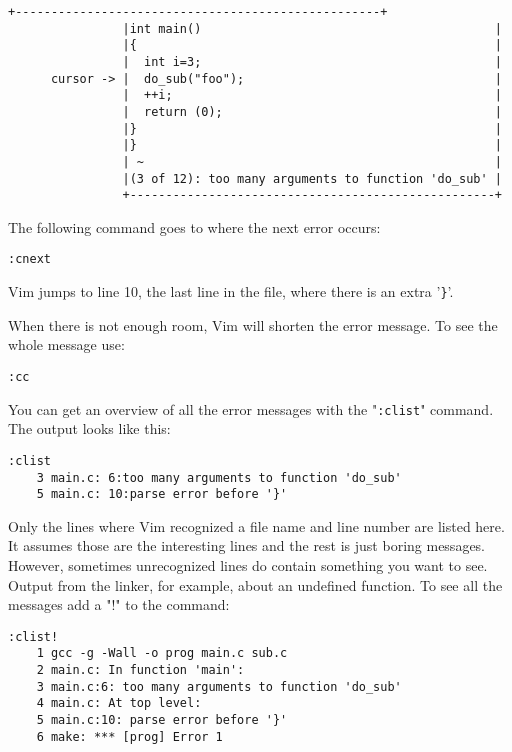 \begin{Verbatim}[samepage=true]
                +---------------------------------------------------+
                |int main()                                         |
                |{                                                  |
                |  int i=3;                                         |
      cursor -> |  do_sub("foo");                                   |
                |  ++i;                                             |
                |  return (0);                                      |
                |}                                                  |
                |}                                                  |
                | ~                                                 |
                |(3 of 12): too many arguments to function 'do_sub' |
                +---------------------------------------------------+
\end{Verbatim}

The following command goes to where the next error occurs:

\begin{Verbatim}[samepage=true]
 :cnext
\end{Verbatim}

Vim jumps to line 10, the last line in the file, where there is an extra '\verb!}!'.

When there is not enough room, Vim will shorten the error message.
To see the whole message use:

\begin{Verbatim}[samepage=true]
 :cc
\end{Verbatim}

You can get an overview of all the error messages with the "\verb!:clist!" command.
The output looks like this:

\begin{Verbatim}[samepage=true]
 :clist
    3 main.c: 6:too many arguments to function 'do_sub' 
    5 main.c: 10:parse error before '}' 
\end{Verbatim}

Only the lines where Vim recognized a file name and line number are listed here.
It assumes those are the interesting lines and the rest is just boring messages.
However, sometimes unrecognized lines do contain something you want to see.
Output from the linker, for example, about an undefined function.
To see all the messages add a "\verb!!!" to the command:

\begin{Verbatim}[samepage=true]
 :clist!
    1 gcc -g -Wall -o prog main.c sub.c 
    2 main.c: In function 'main': 
    3 main.c:6: too many arguments to function 'do_sub' 
    4 main.c: At top level: 
    5 main.c:10: parse error before '}' 
    6 make: *** [prog] Error 1 
\end{Verbatim}

